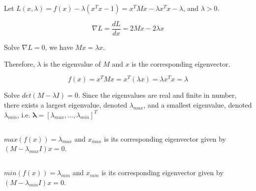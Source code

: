 \documentclass{article}
\theoremstyle{definition} %
\begin{document}
Let $L(x, \lambda) = f(x) -\lambda (x^Tx-1) = x^TMx - \lambda x^Tx - \lambda$, and $\lambda > 0$.

$$\nabla L = \frac{dL}{dx} = 2Mx - 2\lambda x$$

Solve $\nabla L = 0$, we have $Mx = \lambda x$.

Therefore, $\lambda$ is the eigenvalue of $M$ and $x$ is the corresponding eigenvector.

$$
f(x) = x^TMx = x^T(\lambda x) = \lambda x^T x = \lambda
$$

Solve $det(M-\lambda I)=0$. Since the eigenvalues are real and finite in number, there exists a largest eigenvalue, denoted $\lambda_{max}$,
and a smallest eigenvalue, denoted  $\lambda_{min}$, i.e. $\boldsymbol \lambda = [\lambda_{max}, \dots, \lambda_{min}]^T$

\subsection{}

$max(f(x)) = \lambda_{max}$ and $x_{max}$ is its corresponding eigenvector given by $(M - \lambda_{max}I)x=0$.

\subsection{}


$min(f(x)) = \lambda_{min}$ and $x_{min}$ is its corresponding eigenvector given by $(M - \lambda_{min}I)x=0$.
\end{document}
